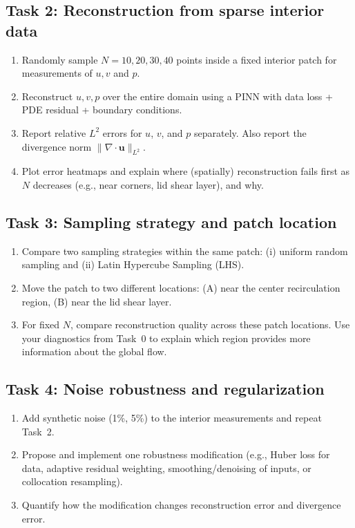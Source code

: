 \documentclass{article}
\begin{document}
\subsection*{Task 2: Reconstruction from sparse interior data}
\begin{enumerate}
\item Randomly sample $N=10,20,30,40$ points inside a fixed interior patch for measurements of $u,v$ and $p$.
\item Reconstruct $u,v,p$ over the entire domain using a PINN with data loss + PDE residual + boundary conditions.
\item Report relative $L^2$ errors for $u$, $v$, and $p$ separately. Also report the divergence norm $\|\nabla\cdot\mathbf{u}\|_{L^2}$.
\item Plot error heatmaps and explain where (spatially) reconstruction fails first as $N$ decreases (e.g., near corners, lid shear layer), and why.
\end{enumerate}

\subsection*{Task 3: Sampling strategy and patch location}
\begin{enumerate}
\item Compare two sampling strategies within the same patch: (i) uniform random sampling and (ii) Latin Hypercube Sampling (LHS).
\item Move the patch to two different locations: (A) near the center recirculation region, (B) near the lid shear layer.
\item For fixed $N$, compare reconstruction quality across these patch locations. Use your diagnostics from Task~0 to explain which region provides more information about the global flow.
\end{enumerate}

\subsection*{Task 4: Noise robustness and regularization}
\begin{enumerate}
\item Add synthetic noise (1\%, 5\%) to the interior measurements and repeat Task~2.
\item Propose and implement one robustness modification (e.g., Huber loss for data, adaptive residual weighting, smoothing/denoising of inputs, or collocation resampling).
\item Quantify how the modification changes reconstruction error and divergence error.
\end{enumerate}
\end{document}
